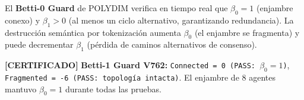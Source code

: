 El \textbf{Betti-0 Guard} de POLYDIM verifica en tiempo real que $\beta_0 = 1$
(enjambre conexo) y $\beta_1 > 0$ (al menos un ciclo alternativo, garantizando
redundancia). La destrucción semántica por tokenización aumenta $\beta_0$ (el
enjambre se fragmenta) y puede decrementar $\beta_1$ (pérdida de caminos
alternativos de consenso).

\textbf{[CERTIFICADO]} 
\textbf{Betti-1 Guard V762:}
\texttt{Connected = 0 (PASS: $\beta_0 = 1$)},
\texttt{Fragmented = -6 (PASS: topología intacta)}.
El enjambre de 8 agentes mantuvo $\beta_0 = 1$ durante todas las pruebas.

